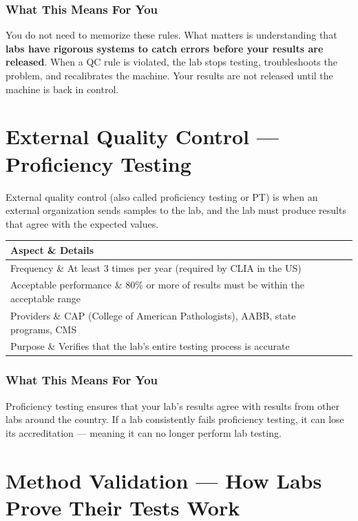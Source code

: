 \subsubsection{What This Means For You}

You do not need to memorize these rules. What matters is understanding that \textbf{labs have rigorous systems to catch errors before your results are released}. When a QC rule is violated, the lab stops testing, troubleshoots the problem, and recalibrates the machine. Your results are not released until the machine is back in control.

\clearpage
\section{External Quality Control --- Proficiency Testing}

External quality control (also called proficiency testing or PT) is when an external organization sends samples to the lab, and the lab must produce results that agree with the expected values.

\begin{longtable}{@{}ll@{}}
\toprule
\textbf{Aspect} \& \textbf{Details} \\
\midrule
Frequency \& At least 3 times per year (required by CLIA in the US) \\
Acceptable performance \& 80\% or more of results must be within the acceptable range \\
Providers \& CAP (College of American Pathologists), AABB, state programs, CMS \\
Purpose \& Verifies that the lab's entire testing process is accurate \\
\bottomrule
\end{longtable}

\subsubsection{What This Means For You}

Proficiency testing ensures that your lab's results agree with results from other labs around the country. If a lab consistently fails proficiency testing, it can lose its accreditation --- meaning it can no longer perform lab testing.

\clearpage
\section{Method Validation --- How Labs Prove Their Tests Work}

